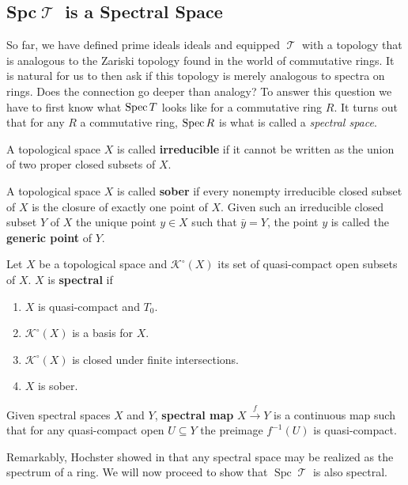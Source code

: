 \documentclass[11pt]{article}
\DeclareMathOperator{\TT}{\mathcal{T}}
\DeclareMathOperator{\spc}{Spc}
\begin{document}
\subsection{Spc\texorpdfstring{$\TT$}{𝓣} is a Spectral Space}

So far, we have defined prime ideals ideals and equipped $\TT$ with a topology that is analogous to the Zariski topology found in the world of commutative rings. It is natural for us to then ask if this topology is merely analogous to spectra on rings. Does the connection go deeper than analogy? To answer this question we have to first know what $\operatorname{Spec} T$ looks like for a commutative ring $R$. It turns out that for any $R$ a commutative ring, $\operatorname{Spec} R$ is what is called a \textit{spectral space}.

\begin{defn}
A topological space $X$ is called \textbf{irreducible} if it cannot be written as the union of two proper closed subsets of $X$.

A topological space $X$ is called \textbf{sober} if every nonempty irreducible closed subset of $X$ is the closure of exactly one point of $X$. Given such an irreducible closed subset $Y$ of $X$ the unique point $y \in X$ such that $\bar y = Y$, the point $y$ is called the \textbf{generic point} of $Y$.
\end{defn}

\begin{defn}
Let $X$ be a topological space and $\mathcal{K}^\circ(X)$ its set of quasi-compact open subsets of $X$. $X$ is \textbf{spectral} if
\begin{enumerate}[1.]
	\item $X$ is quasi-compact and $T_0$.
	\item $\mathcal{K}^{\circ}(X)$ is a basis for $X$.
	\item $\mathcal{K}^\circ(X)$ is closed under finite intersections.
	\item $X$ is sober.
\end{enumerate}
Given spectral spaces $X$ and $Y$,  \textbf{spectral map} $X \xrightarrow{f} Y$ is a continuous map such that for any quasi-compact open $U \subseteq Y$ the preimage $f^{-1}(U)$ is quasi-compact.
\end{defn}

Remarkably, Hochster showed in \cite{Hochster:1969} that any spectral space may be realized as the spectrum of a ring. We will now proceed to show that $\spc \TT$ is also spectral.
\end{document}

